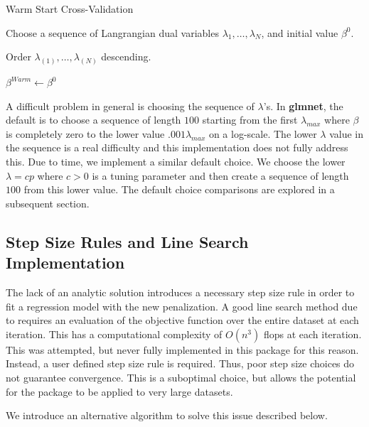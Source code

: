 \documentclass[article]{jss}
\numberwithin{equation}{section}
\begin{document}
\vspace{.2cm}
\begin{algorithm}[H]
\caption{Warm Start Cross-Validation}
Choose a sequence of Langrangian dual variables $\lambda_1, \ldots, \lambda_N$, and initial value $\beta^0$.

Order $\lambda_{(1)}, \ldots, \lambda_{(N)}$ descending.

$\beta^{Warm} \gets \beta^0$ 


\end{algorithm}
\vspace{.2cm}

A difficult problem in general is choosing the sequence of $\lambda$'s.
In \textbf{glmnet}, the default is to choose a sequence of length $100$ starting from the first $\lambda_{max}$ where $\beta$ is completely zero to the lower value $.001 \lambda_{max}$ on a log-scale.
The lower $\lambda$ value in the sequence is a real difficulty and this implementation does not fully address this.
Due to time, we implement a similar default choice.
We choose the lower $\lambda = c p$ where $c > 0$ is a tuning parameter and then create a sequence of length $100$ from this lower value.
The default choice comparisons are explored in a subsequent section.

\subsection{Step Size Rules and Line Search Implementation}

The lack of an analytic solution introduces a necessary step size rule in order to fit a regression model with the new penalization.
A good line search method due to \cite{beck_teboulle} requires an evaluation of the objective function over the entire dataset at each iteration. This has a computational complexity of $O(n^3)$ flops at each iteration. This was attempted, but never fully implemented in this package for this reason. Instead, a user defined step size rule is required. Thus, poor step size choices do not guarantee convergence.
This is a suboptimal choice, but allows the potential for the package to be applied to very large datasets.

We introduce an alternative algorithm to solve this issue described below.
\end{document}
